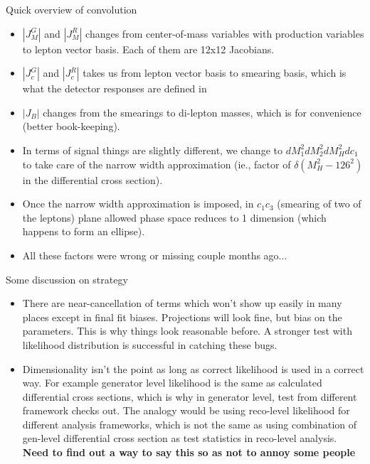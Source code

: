 \documentclass[11pt,t]{beamer}
\begin{document}
\begin{frame}{Quick overview of convolution}
   \begin{itemize}
   \item $|J_M^G|$ and $|J_M^R|$ changes from center-of-mass variables with production variables to lepton vector basis.
   Each of them are 12x12 Jacobians.
   \item $|J_c^G|$ and $|J_c^R|$ takes us from lepton vector basis to smearing basis, which is what the detector responses are defined in
   \item $|J_B|$ changes from the smearings to di-lepton masses, which is for convenience (better book-keeping).
   \item In terms of signal things are slightly different, we change to $d M_1^2 d M_2^2 d M_H^2 d c_1$ to take care of the
   narrow width approximation (ie., factor of $\delta(M_H^2 - 126^2)$ in the differential cross section).
   \item Once the narrow width approximation is imposed, in $c_1 c_3$ (smearing of two of the leptons)
   plane allowed phase space reduces to
   1 dimension (which happens to form an ellipse).
   \item All these factors were wrong or missing couple months ago...
   \end{itemize}
\end{frame}

\begin{frame}{Some discussion on strategy}
   \begin{itemize}
   \item There are near-cancellation of terms which won't show up easily in many places except in final fit biases.
   Projections will look fine, but bias on the parameters.  This is why things look reasonable before.
   A stronger test with likelihood distribution is successful in catching these bugs.
   \item Dimensionality isn't the point as long as correct likelihood is used in a correct way.
   For example generator level likelihood is the same as calculated differential cross sections,
   which is why in generator level, test from different framework checks out.
   The analogy would be using reco-level likelihood for different analysis frameworks, which
   is not the same as using combination of gen-level differential cross section as test statistics in
   reco-level analysis. \textbf{Need to find out a way to say this so as not to annoy some people}
   \end{itemize}
\end{frame}
\end{document}
